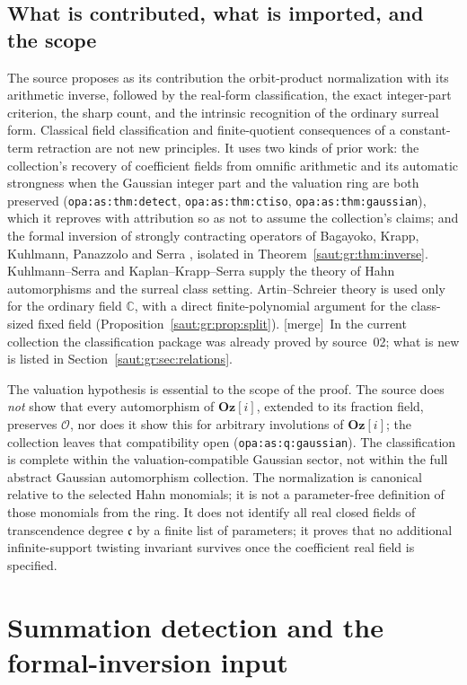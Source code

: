 \documentclass[11pt]{article}
\theoremstyle{definition}
\theoremstyle{remark}
\newcommand{\C}{\mathbb C}
\newcommand{\OO}{\mathcal O}
\newcommand{\lbl}[1]{\nolinkurl{#1}}%
\newcommand{\Oz}{\mathbf{Oz}}
\newcommand{\cc}{\mathfrak c}
\newcommand{\mergetag}{\textup{[merge]}}
\numberwithin{equation}{section}
\begin{document}
\subsection{What is contributed, what is imported, and the scope}\label{saut:gr:sec:scope}

The source proposes as its contribution the orbit-product normalization with its
arithmetic inverse, followed by the real-form classification, the exact
integer-part criterion, the sharp count, and the intrinsic recognition of the
ordinary surreal form. Classical field classification and finite-quotient
consequences of a constant-term retraction are not new principles. It uses two kinds
of prior work: the collection's recovery of coefficient fields from omnific
arithmetic and its automatic strongness when the Gaussian integer part and the
valuation ring are both preserved (\lbl{opa:as:thm:detect}, \lbl{opa:as:thm:ctiso},
\lbl{opa:as:thm:gaussian}), which it reproves with attribution so as not to assume
the collection's claims; and the formal inversion of strongly contracting operators
of Bagayoko, Krapp, Kuhlmann, Panazzolo and Serra \cite{BKKS}, isolated in
Theorem~\ref{saut:gr:thm:inverse}. Kuhlmann--Serra \cite{KS} and
Kaplan--Krapp--Serra \cite{KKS} supply the theory of Hahn automorphisms and the
surreal class setting. Artin--Schreier theory is used only for the ordinary field
$\C$, with a direct finite-polynomial argument for the class-sized fixed field
(Proposition~\ref{saut:gr:prop:split}).
\mergetag\ In the current collection the classification package was already
proved by source~02; what is new is listed in Section~\ref{saut:gr:sec:relations}.

The valuation hypothesis is essential to the scope of the proof. The source does
\emph{not} show that every automorphism of $\Oz[i]$, extended to its fraction field,
preserves $\OO$, nor does it show this for arbitrary involutions of $\Oz[i]$; the
collection leaves that compatibility open (\lbl{opa:as:q:gaussian}). The
classification is complete within the valuation-compatible Gaussian sector, not
within the full abstract Gaussian automorphism collection. The normalization is
canonical relative to the selected Hahn monomials; it is not a parameter-free
definition of those monomials from the ring. It does not identify all real closed
fields of transcendence degree $\cc$ by a finite list of parameters; it proves that
no additional infinite-support twisting invariant survives once the coefficient real
field is specified.

\section{Summation detection and the formal-inversion input}\label{saut:gr:sec:inverse}
\end{document}
